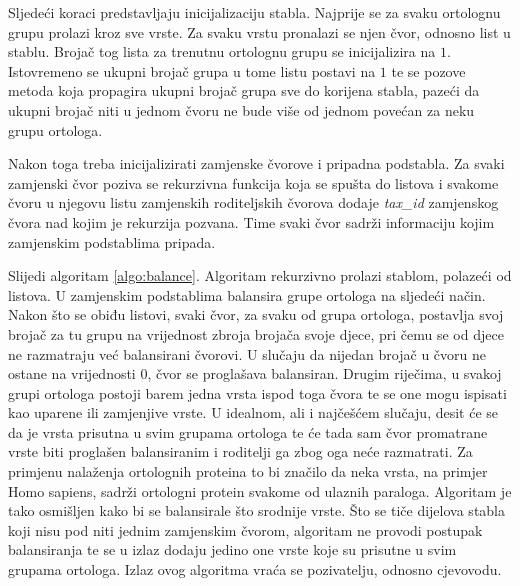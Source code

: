 Sljedeći koraci predstavljaju inicijalizaciju stabla. Najprije se za svaku
ortolognu grupu prolazi kroz sve vrste. Za svaku vrstu pronalazi se njen čvor,
odnosno list u stablu. Brojač tog lista za trenutnu ortolognu grupu se
inicijalizira na $1$. Istovremeno se ukupni brojač grupa u tome listu postavi na
$1$ te se pozove metoda koja propagira ukupni brojač grupa sve do korijena
stabla, pazeći da ukupni brojač niti u jednom čvoru ne bude više od jednom
povećan za neku grupu ortologa.



Nakon toga treba inicijalizirati zamjenske čvorove i pripadna podstabla. Za
svaki zamjenski čvor poziva se rekurzivna funkcija koja se spušta do listova i
svakome čvoru u njegovu listu zamjenskih roditeljskih čvorova dodaje
\emph{tax\_id} zamjenskog čvora nad kojim je rekurzija pozvana.  Time svaki čvor
sadrži informaciju kojim zamjenskim podstablima pripada.

Slijedi algoritam \ref{algo:balance}. Algoritam rekurzivno prolazi stablom,
polazeći od listova. U zamjenskim podstablima balansira grupe ortologa na
sljedeći način. Nakon što se obiđu listovi, svaki čvor, za svaku od grupa
ortologa, postavlja svoj brojač za tu grupu na vrijednost zbroja brojača svoje
djece, pri čemu se od djece ne razmatraju već balansirani čvorovi. U slučaju da
nijedan brojač u čvoru ne ostane na vrijednosti $0$, čvor se proglašava
balansiran. Drugim riječima, u svakoj grupi ortologa postoji barem jedna vrsta
ispod toga čvora te se one mogu ispisati kao uparene ili zamjenjive vrste.  U
idealnom, ali i najčešćem slučaju, desit će se da je vrsta prisutna u svim
grupama ortologa te će tada sam čvor promatrane vrste biti proglašen
balansiranim i roditelji ga zbog oga neće razmatrati. Za primjenu nalaženja
ortolognih proteina to bi značilo da neka vrsta, na primjer Homo sapiens, sadrži
ortologni protein svakome od ulaznih paraloga. Algoritam je tako osmišljen kako
bi se balansirale što srodnije vrste.  Što se tiče dijelova stabla koji nisu pod
niti jednim zamjenskim čvorom, algoritam ne provodi postupak balansiranja te se
u izlaz dodaju jedino one vrste koje su prisutne u svim grupama ortologa. Izlaz
ovog algoritma vraća se pozivatelju, odnosno cjevovodu.


